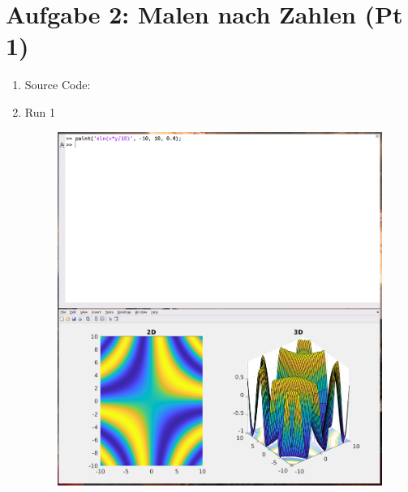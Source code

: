 \documentclass[12pt,a4paper]{article}
\begin{document}
\section*{Aufgabe 2: Malen nach Zahlen (Pt 1)}
\begin{enumerate}[leftmargin=!,labelindent=5pt]
	\item Source Code:
		
		\newpage

	\item Run 1
		\begin{figure}[H]
			\centering
			\includegraphics[scale=0.7]{./img/paint_01.png}
		\end{figure}
		\newpage


\end{enumerate}
\end{document}
